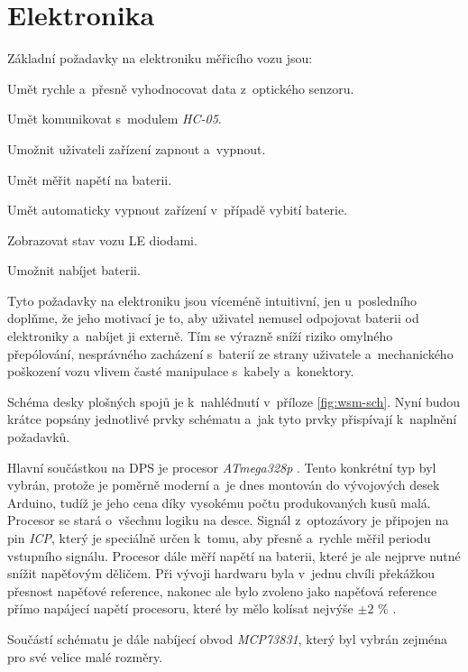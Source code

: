 \section{Elektronika}
\label{sec:wsm-ele}

Základní požadavky na elektroniku měřicího vozu jsou:

\begin{compactenum}
\item Umět rychle a~přesně vyhodnocovat data z~optického senzoru.
\item Umět komunikovat s~modulem \textit{HC-05}.
\item Umožnit uživateli zařízení zapnout a~vypnout.
\item Umět měřit napětí na baterii.
\item Umět automaticky vypnout zařízení v~případě vybití baterie.
\item Zobrazovat stav vozu LE diodami.
\item Umožnit nabíjet baterii.
\end{compactenum}

Tyto požadavky na elektroniku jsou víceméně intuitivní, jen u~posledního
doplňme, že jeho motivací je to, aby uživatel nemusel odpojovat baterii od
elektroniky a~nabíjet ji externě. Tím se výrazně sníží riziko omylného
přepólování, nesprávného zacházení s~baterií ze strany uživatele a~mechanického
poškození vozu vlivem časté manipulace s~kabely a~konektory.

Schéma desky plošných spojů je k~nahlédnutí v~příloze \ref{fig:wsm-sch}. Nyní
budou krátce popsány jednotlivé prvky schématu a~jak tyto prvky přispívají
k~naplnění požadavků.

Hlavní součástkou na DPS je procesor \textit{ATmega328p}
\cite{atmega328p:datasheet}.  Tento konkrétní typ byl vybrán, protože je
poměrně moderní a~je dnes montován do vývojových desek Arduino, tudíž je jeho
cena díky vysokému počtu produkovaných kusů malá. Procesor se stará o~všechnu
logiku na desce.  Signál z~optozávory je připojen na pin \textit{\gls{ICP}},
který je speciálně určen k~tomu, aby přesně a~rychle měřil periodu vstupního
signálu. Procesor dále měří napětí na baterii, které je ale nejprve nutné
snížit napěťovým děličem. Při vývoji hardwaru byla v~jednu chvíli překážkou
přesnost napěťové reference, nakonec ale bylo zvoleno jako napěťová reference
přímo napájecí napětí procesoru, které by mělo kolísat nejvýše $\pm 2$ \%
\cite{ldo:datasheet}.

Součástí schématu je dále nabíjecí obvod \textit{MCP73831}, který byl vybrán
zejména pro své velice malé rozměry.

